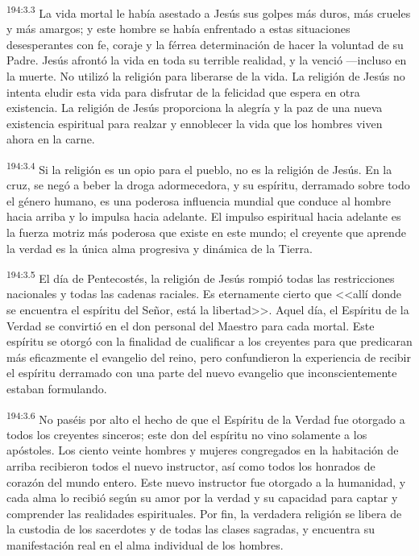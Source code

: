 \par 
\textsuperscript{194:3.3} La vida mortal le había asestado a Jesús sus golpes más duros, más crueles y más amargos; y este hombre se había enfrentado a estas situaciones desesperantes con fe, coraje y la férrea determinación de hacer la voluntad de su Padre. Jesús afrontó la vida en toda su terrible realidad, y la venció ---incluso en la muerte. No utilizó la religión para liberarse de la vida. La religión de Jesús no intenta eludir esta vida para disfrutar de la felicidad que espera en otra existencia. La religión de Jesús proporciona la alegría y la paz de una nueva existencia espiritual para realzar y ennoblecer la vida que los hombres viven ahora en la carne.

\par 
\textsuperscript{194:3.4} Si la religión es un opio para el pueblo, no es la religión de Jesús. En la cruz, se negó a beber la droga adormecedora, y su espíritu, derramado sobre todo el género humano, es una poderosa influencia mundial que conduce al hombre hacia arriba y lo impulsa hacia adelante. El impulso espiritual hacia adelante es la fuerza motriz más poderosa que existe en este mundo; el creyente que aprende la verdad es la única alma progresiva y dinámica de la Tierra.

\par 
\textsuperscript{194:3.5} El día de Pentecostés, la religión de Jesús rompió todas las restricciones nacionales y todas las cadenas raciales. Es eternamente cierto que <<allí donde se encuentra el espíritu del Señor, está la libertad>>. Aquel día, el Espíritu de la Verdad se convirtió en el don personal del Maestro para cada mortal. Este espíritu se otorgó con la finalidad de cualificar a los creyentes para que predicaran más eficazmente el evangelio del reino, pero confundieron la experiencia de recibir el espíritu derramado con una parte del nuevo evangelio que inconscientemente estaban formulando.

\par 
\textsuperscript{194:3.6} No paséis por alto el hecho de que el Espíritu de la Verdad fue otorgado a todos los creyentes sinceros; este don del espíritu no vino solamente a los apóstoles. Los ciento veinte hombres y mujeres congregados en la habitación de arriba recibieron todos el nuevo instructor, así como todos los honrados de corazón del mundo entero. Este nuevo instructor fue otorgado a la humanidad, y cada alma lo recibió según su amor por la verdad y su capacidad para captar y comprender las realidades espirituales. Por fin, la verdadera religión se libera de la custodia de los sacerdotes y de todas las clases sagradas, y encuentra su manifestación real en el alma individual de los hombres.

